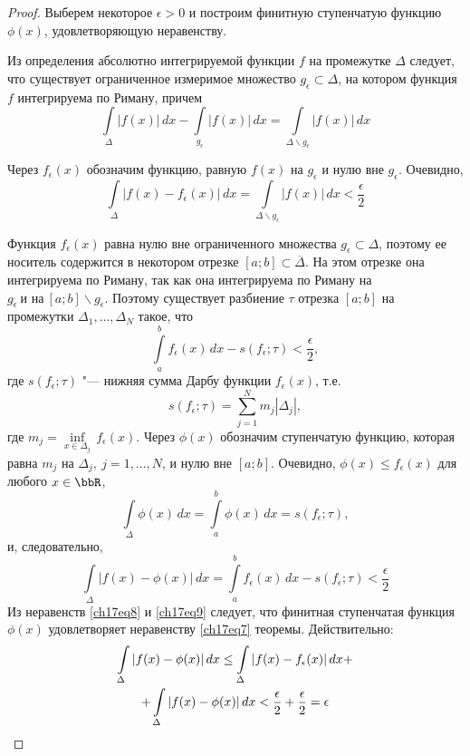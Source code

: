 \begin{proof}
Выберем некоторое $\epsilon > 0$ и построим финитную ступенчатую функцию $\phi(x)$, удовлетворяющую неравенству.

Из определения абсолютно интегрируемой функции $f$ на промежутке $\Delta$ следует, что существует ограниченное измеримое множество $g_{\epsilon} \subset \Delta$, на котором функция $f$ интегрируема по Риману, причем
$$
\int\limits_{\Delta} |f(x)|\,dx - \int\limits_{g_{\epsilon}} |f(x)|\,dx = \int\limits_{\Delta\backslash g_{\epsilon}} |f(x)|\,dx
$$

Через $f_{\epsilon}(x)$ обозначим функцию, равную $f(x)$ на $g_{\epsilon}$ и нулю вне $g_{\epsilon}$. Очевидно,
\begin{equation} \label{ch17eq8}
\int\limits_{\Delta} |f(x) - f_{\epsilon}(x)|\,dx = \int\limits_{\Delta\backslash g_{\epsilon}} |f(x)|\,dx < \frac{\epsilon}{2}
\end{equation}

Функция $f_{\epsilon}(x)$ равна нулю вне ограниченного множества $g_{\epsilon} \subset \Delta$, поэтому ее носитель содержится в некотором отрезке $[a;b] \subset \overline{\Delta}$. На этом отрезке она интегрируема по Риману, так как она интегрируема по Риману на $g_{\epsilon}\ \text{и на}\ [a;b]\backslash g_{\epsilon}$. Поэтому существует разбиение $\tau$ отрезка $[a;b]$ на промежутки $\Delta_1,\ldots,\Delta_N$ такое, что
$$
\int\limits_{a}^{b} f_{\epsilon}(x)\,dx - s(f_{\epsilon};\tau) < \frac{\epsilon}{2},
$$
где $s(f_{\epsilon};\tau)$ "--- нижняя сумма Дарбу функции $f_{\epsilon}(x)$, т.е.
$$
s(f_{\epsilon};\tau) = \sum_{j = 1}^{N} m_{j}|\Delta_j|,
$$
где $m_j = \inf\limits_{x \in \Delta_j}\,f_{\epsilon}(x)$. Через $\phi(x)$ обозначим ступенчатую функцию, которая равна $m_j$ на $\Delta_j,\ j = 1,\ldots,N$, и нулю вне $[a;b]$. Очевидно, $\phi(x) \le f_{\epsilon}(x)$ для любого $x \in \bbR$,
$$
\int\limits_{\Delta} \phi(x)\,dx = \int\limits_{a}^{b} \phi(x)\,dx = s(f_{\epsilon};\tau),
$$
и, следовательно,
\begin{equation} \label{ch17eq9}
\int\limits_{\Delta} |f(x) - \phi(x)|\,dx = \int\limits_{a}^{b} f_{\epsilon}(x)\,dx - s(f_{\epsilon};\tau) < \frac{\epsilon}{2}
\end{equation}
Из неравенств \eqref{ch17eq8} и \eqref{ch17eq9} следует, что финитная ступенчатая функция $\phi(x)$ удовлетворяет неравенству \eqref{ch17eq7} теоремы. Действительно:
\begin{multline*}
\int\limits_{\Delta} |f(x) - \phi(x)|\,dx \le \int\limits_{\Delta} |f(x) - f_{\epsilon}(x)|\,dx+\\
+\int\limits_{\Delta} |f(x) - \phi(x)|\,dx < \frac{\epsilon}{2} + \frac{\epsilon}{2} = \epsilon \qedhere
\end{multline*}
\end{proof}

